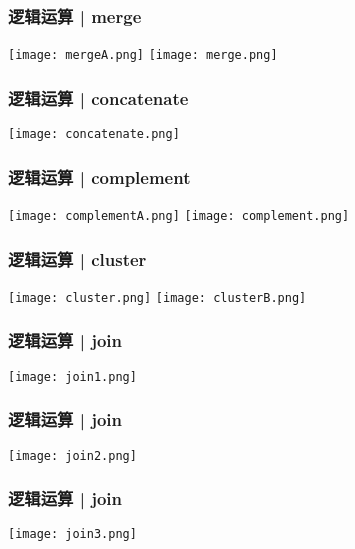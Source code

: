 \documentclass[table]{beamer}
\begin{document}
\begin{frame}
  \frametitle{逻辑运算 | merge}
    \begin{center}
      \texttt{[image: mergeA.png]}
      \vspace{1cm}
      \texttt{[image: merge.png]}
    \end{center}
\end{frame}

\begin{frame}
  \frametitle{逻辑运算 | concatenate}
    \begin{center}
      \texttt{[image: concatenate.png]}
    \end{center}
\end{frame}

\begin{frame}
  \frametitle{逻辑运算 | complement}
    \begin{center}
      \texttt{[image: complementA.png]}
      \vspace{1cm}
      \texttt{[image: complement.png]}
    \end{center}
\end{frame}

\begin{frame}
  \frametitle{逻辑运算 | cluster}
    \begin{center}
      \texttt{[image: cluster.png]}
      \vspace{0.1cm}
      \texttt{[image: clusterB.png]}
    \end{center}
\end{frame}

\begin{frame}
  \frametitle{逻辑运算 | join}
    \begin{center}
      \texttt{[image: join1.png]}
    \end{center}
\end{frame}

\begin{frame}
  \frametitle{逻辑运算 | join}
    \begin{center}
      \texttt{[image: join2.png]}
    \end{center}
\end{frame}

\begin{frame}
  \frametitle{逻辑运算 | join}
    \begin{center}
      \texttt{[image: join3.png]}
    \end{center}
\end{frame}
\end{document}
